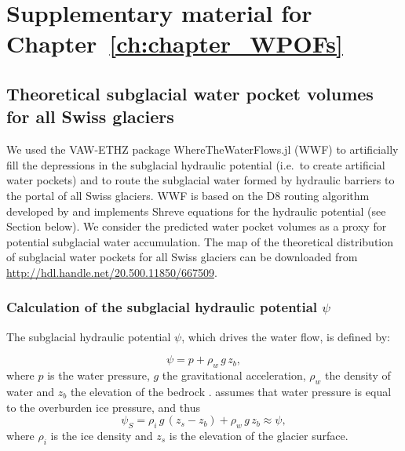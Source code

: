 \chapter{Supplementary material for Chapter~\ref{ch:chapter_WPOFs}}

\section{Theoretical subglacial water pocket volumes for all Swiss glaciers}
\label{Appendix:subglacialWP}

\setcounter{equation}{0}

We used the VAW-ETHZ package WhereTheWaterFlows.jl (WWF) to artificially fill the depressions in the subglacial hydraulic potential (i.e.\ to create artificial water pockets) and to route the subglacial water formed by hydraulic barriers to the portal of all Swiss glaciers. WWF is based on the D8 routing algorithm developed by \cite{O'Callagan&al1984} and implements Shreve equations \citep{Shreve1972} for the hydraulic potential (see Section below). We consider the predicted water pocket volumes as a proxy for potential subglacial water accumulation.
The map of the theoretical distribution of subglacial water pockets for all Swiss glaciers can be downloaded from \url{http://hdl.handle.net/20.500.11850/667509}.


\subsection{ Calculation of the subglacial hydraulic potential $\psi$}

The subglacial hydraulic potential $\psi$, which drives the water flow, is defined by:

\begin{equation}
     \psi = p + \rho_w\,g\,z_b,
     \label{eq:phi}
\end{equation}
%
where $p$ is the water pressure, $g$ the gravitational acceleration, $\rho_w$ the density of water and $z_b$ the elevation of the bedrock \citep{Cuffey&Paterson2010}. \cite{Shreve1972} assumes that water pressure is equal to the overburden ice pressure, and thus
%
\begin{equation}
     \psi_S = \rho_i\,g\,(z_s - z_b) + \rho_w\,g\,z_b \approx \psi,
     \label{eq:p}
\end{equation}
%
where $\rho_i$ is the ice density and $z_s$ is the elevation of the glacier surface. 

